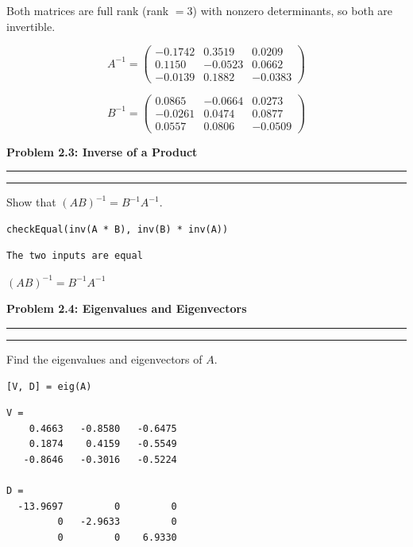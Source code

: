 \documentclass[12pt]{article}
\newcommand{\questionpart}[1]{%
  \clearpage
  \vspace{0.5cm}
  {\noindent\normalsize \textbf{#1}}
  \vspace{0.2cm}
  \hrule
  \vspace{0.1cm}
  \hrule
  \vspace{0.3cm}
}
\begin{document}
\begin{resultsbox}
Both matrices are full rank (rank $= 3$) with nonzero determinants, so both are invertible.

\[
A^{-1} = \begin{pmatrix} -0.1742 & 0.3519 & 0.0209 \\ 0.1150 & -0.0523 & 0.0662 \\ -0.0139 & 0.1882 & -0.0383 \end{pmatrix}
\]

\[
B^{-1} = \begin{pmatrix} 0.0865 & -0.0664 & 0.0273 \\ -0.0261 & 0.0474 & 0.0877 \\ 0.0557 & 0.0806 & -0.0509 \end{pmatrix}
\]
\end{resultsbox}

\questionpart{Problem 2.3: Inverse of a Product}\label{prob:2.3}

Show that $\left(AB\right)^{-1} = B^{-1}A^{-1}$.

\begin{codebox}
\begin{lstlisting}
checkEqual(inv(A * B), inv(B) * inv(A))
\end{lstlisting}
\end{codebox}

\begin{outputbox}
\begin{lstlisting}[style=output]
The two inputs are equal
\end{lstlisting}
\end{outputbox}

\begin{resultsbox}
$(AB)^{-1} = B^{-1}A^{-1}$ \quad \checkmark
\end{resultsbox}

\questionpart{Problem 2.4: Eigenvalues and Eigenvectors}\label{prob:2.4}

Find the eigenvalues and eigenvectors of $A$.

\begin{codebox}
\begin{lstlisting}
[V, D] = eig(A)
\end{lstlisting}
\end{codebox}

\begin{outputbox}
\begin{lstlisting}[style=output]
V =
    0.4663   -0.8580   -0.6475
    0.1874    0.4159   -0.5549
   -0.8646   -0.3016   -0.5224

D =
  -13.9697         0         0
         0   -2.9633         0
         0         0    6.9330
\end{lstlisting}
\end{outputbox}
\end{document}
